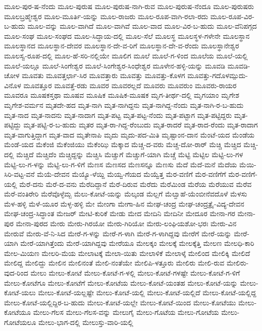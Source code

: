 ಮೂಲ-ಪುರ-ಷ-ನೆಂದು
ಮೂಲ-ಪುರುಷ
ಮೂಲ-ಪುರುಷ-ನಾಗಿ-ರುವ
ಮೂಲ-ಪುರುಷ-ನೆಂದೂ
ಮೂಲ-ಪುರುಷರು
ಮೂಲಬ್ರಹ್ಮೇಶ್ವರ
ಮೂಲ-ಮೂರ್ತಿ-ಯನ್ನು
ಮೂಲ-ರಾಜರು
ಮೂಲ-ರೂಪ-ವಾಗಿ-ರಲಾ-ರದು
ಮೂಲ-ರೂಪ-ವಿರ-ಬ-ಹುದು
ಮೂಲ-ವನ್ನು
ಮೂಲ-ವಾಗಿದೆ
ಮೂಲ-ವಾಗಿವೆ
ಮೂಲ-ವಾದ
ಮೂಲ-ವಿರ-ಬ-ಹುದು
ಮೂಲ-ವೆನಿಪಗ್ಗದ
ಮೂಲ-ಸಂಘ
ಮೂಲ-ಸಂಘದ
ಮೂಲ-ಸಿದ್ಧಾಯ-ದಲ್ಲಿ
ಮೂಲ-ಸೆಲೆ
ಮೂಲಸ್ಥ
ಮೂಲಸ್ಥಳ-ಗಳೇನೇ
ಮೂಲಸ್ಥಾನ
ಮೂಲಸ್ಥಾನದ
ಮೂಲಸ್ಥಾನ-ದೇವರ
ಮೂಲಸ್ಥಾನ-ದೇ-ವ-ರಿಗೆ
ಮೂಲಸ್ಥಾನ-ದೇ-ವ-ರೆಂದು
ಮೂಲಸ್ಥಾನೇಶ್ವರ
ಮೂಲಸ್ವ-ರೂಪ-ದಲ್ಲಿ
ಮೂಲ-ಹೆ-ಸರಿ-ನಲ್ಲಿಯೇ
ಮೂಲಿಗ
ಮೂಲೆ
ಮೂಲೆ-ಗ-ಳಿಂದ
ಮೂಲೆಯ
ಮೂಲೆ-ಯಲ್ಲಿ
ಮೂಲೆ-ಯಲ್ಲೂ
ಮೂಲೆ-ಸಿಂಗೇಶ್ವರ
ಮೂಲೆ-ಸಿಂಗೇಶ್ವರ-ಸಿಂಧೇಶ್ವರ
ಮೂಳೇನ-ಹಳ್ಳಿ-ಯನ್ನು
ಮೂವಡಿ
ಮೂವಡಿ-ಚೋಳ
ಮೂವತು
ಮೂವತ್ತರ್ಛಾ-ಸಿರ
ಮೂವತ್ತಾರು
ಮೂವತ್ತು
ಮೂವತ್ತು-ಕೊಳಗ
ಮೂವತ್ತು-ಗದೊಳಮ್ಪುದು-ವಿನೊಳ
ಮೂವತ್ತೂರ
ಮೂವತ್ತೆ-ರಡು
ಮೂವರ
ಮೂವರಲ್ಲದೆ
ಮೂವರು
ಮೂವರುಂ
ಮೂವರು-ರಾಯರ
ಮೂವರೂ
ಮೂಷಕಸ್ತಥಾ
ಮೂಷವ
ಮೂಷಿಕ
ಮೂಷಿಕ-ಮೂಷಕ
ಮೃಗ-ತೀರ್ಥ-ದಲ್ಲಿ
ಮೃಗಯಾಂ
ಮೃಗೇಶ
ಮೃಗೇಶ-ವರ್ಮನ
ಮೃತದೇ-ಹದ
ಮೃತ-ನಾಗಿ
ಮೃತ-ನಾಗಿದ್ದನು
ಮೃತ-ನಾಗಿದ್ದ-ನೆಂದು
ಮೃತ-ನಾಗಿ-ರ-ಬ-ಹುದು
ಮೃತ-ನಾದ
ಮೃತ-ನಾದನು
ಮೃತ-ನಾದಾಗ
ಮೃತ-ಪಟ್ಟ
ಮೃತ-ಪಟ್ಟ-ನೆಂದು
ಮೃತ-ಪಟ್ಟಾಗ
ಮೃತ-ಪಟ್ಟಿದ್ದರು
ಮೃತ-ಪಟ್ಟಿದ್ದು
ಮೃತ-ಪಟ್ಟಿ-ರ-ಬ-ಹುದು
ಮೃತರ
ಮೃತ-ರಾ-ಗಿದ್ದ-ರೆಂಬುದು
ಮೃತ-ರಾದರೆ
ಮೃತ-ರಾದ-ರೆಂದು
ಮೃತ-ರಾದಾಗ
ಮೃತ-ವಾಗುತ್ತಿದ್ದಾಗ
ಮೃತ-ವಾದ
ಮೃತೇನಾಪಿ
ಮೃದು
ಮೃದು-ಪದ-ಮಿತಿ
ಮೃಷ್ಟಾಂನ-ದಾನ
ಮೆಂಟೆ-ಯದ
ಮೆಂಡೆಯ
ಮೆಂಡೆ-ಯದ
ಮೆಕೆಂಜಿ
ಮೆಕೆಂಜಿಯು
ಮೆಕೆಂಝಿ
ಮೆಕ್ಕಾದ
ಮೆಚ್ಚ-ದ-ವರು
ಮೆಚ್ಚ-ದೋ-ರಾರ್
ಮೆಚ್ಚಿ
ಮೆಚ್ಚಿದ
ಮೆಚ್ಚಿ-ದಲ್ಲಿ
ಮೆಚ್ಚಿದೆ
ಮೆಚ್ಚಿದೆಂ
ಮೆಚ್ಚಿದ್ದನ್ನು
ಮೆಚ್ಚಿಸಿ
ಮೆಚ್ಚುಗೆ
ಮೆಚ್ಚುಗೆ-ಯಾಗಿ
ಮೆಚ್ಚೆ
ಮೆಟ್ಟಿ
ಮೆಟ್ಟಿಲ
ಮೆಟ್ಟಿ-ಲು-ಗಳ
ಮೆಟ್ಟಿ-ಲು-ಗ-ಳನ್ನು
ಮೆಟ್ಟಿ-ಲು-ಗ-ಳಿಗೆ
ಮೆಣಸ
ಮೆಣಸದ
ಮೆಣಸನ್ನೂ
ಮೆಣಸು
ಮೆದೆ
ಮೆದೆ-ಮನೆ
ಮೆದೆಯ
ಮೆಯಿ-ಸಿರಿ-ವಟ್ಟ-ವನೆ
ಮೆಯೆ-ದೇವನ
ಮೆಯ್ಯೊ-ಳೆಯ್ದಿ
ಮೆಯ್ವ-ಗೆಯದ
ಮೆಯ್ವೆತ್ತ
ಮೆರ-ವಣಿಗೆ
ಮೆರ-ವಣಿಗೆಗೆ
ಮೆರ-ವಣಿಗೆ-ಯಲ್ಲಿ
ಮೆರೆ-ದನು
ಮೆರೆ-ದ-ವನು
ಮೆರೆದಿದ್ದಾನೆ
ಮೆರೆ-ದಿರುವ
ಮೆರೆದು
ಮೆರೆಮಿಂಡ
ಮೆರೆಯ
ಮೆರೆಯುವ
ಮೆರೆವ
ಮೆರೆ-ವಂತಿರೇರಿ
ಮೆರೆವೊಳ್ಳೆಮ್ಬ
ಮೆಲು-ಕೋಟೆ-ಯನ್ನು
ಮೆಲ್ಕಂಡ
ಮೆಲ್ಲಗೆ
ಮೆಲ್ವಾಹೆ-ಯೆಂಬೀನೆವದೊಳೆ
ಮೆಳಸು
ಮೆಳ-ಹಳ್ಳಿ
ಮೆಳೆ-ಯೂರ
ಮೆಳ್ಳ-ಹಳ್ಳಿ
ಮೇ
ಮೇಂಗಾ
ಮೇಗಾ-ಹಿನ
ಮೇಘ-ಚಂದ್ರ
ಮೇಘ-ಚಂದ್ರತ್ರೈ-ವಿದ್ಯ-ದೇವನ
ಮೇಘ-ಚಂದ್ರ-ಸಿದ್ಧಾಂತ
ಮೇಜರ್
ಮೇಟಿ-ಕುರಿಕೆ
ಮೇಡು
ಮೇದ
ಮೇದಿನಿ
ಮೇದಿನೀ
ಮೇದೂರ
ಮೇನಾ-ಗರ
ಮೇನಾ-ಪುರ
ಮೇನಾ-ಪುರದ
ಮೇರು
ಮೇರು-ಗಿರಯೋ
ಮೇರು-ಗಿರಿಯೋ
ಮೇರು-ಲಂಘಿಯಶೋ-ಭರಃ
ಮೇರು-ವಿನ
ಮೇರುವೆ
ಮೇರು-ವೆ-ನಿ-ಸಿದ
ಮೇರೆ-ಗ-ಳನ್ನು
ಮೇರೆ-ಗ-ಳಾಗಿ
ಮೇರೆ-ಗ-ಳಾಗಿದ್ದವು
ಮೇರೆಗೆ
ಮೇರೆ-ಯನ್ನು
ಮೇರೆ-ಯಾಗಿ
ಮೇರೆ-ಯಾಗಿತ್ತೆಂದು
ಮೇರೆ-ಯಾಗಿದ್ದವು
ಮೇರೆಯೂ
ಮೇಲಕ್ಕಂ
ಮೇಲಕ್ಕೆ
ಮೇಲಕ್ಕೆತ್ತಿ
ಮೇಲಣ
ಮೇಲಧಿ-ಕಾರಿ
ಮೇಲ-ಮಿಯಣ
ಮೇಲರಿ-ಮೆಯ
ಮೇಲಾಟಕ್ಕೆ
ಮೇಲಾ-ಯಿತು
ಮೇಲಾಳಿಕೆ
ಮೇಲಾಳ್ಕೆ
ಮೇಲಿಂದ
ಮೇಲಿಕ್ಕಿ
ಮೇಲಿದೆ
ಮೇಲಿದ್ದ
ಮೇಲಿದ್ದು
ಮೇಲಿನ
ಮೇಲಿನಂತೆ
ಮೇಲಿ-ನಂತೆಯೇ
ಮೇಲಿಪಿ-ಳತ್ತೂರು
ಮೇಲಿರು
ಮೇಲಿ-ರುವ
ಮೇಲಿರು-ವುದ-ರಿಂದ
ಮೇಲು
ಮೇಲು-ಕೋಟೆ
ಮೇಲು-ಕೋಟೆ-ಗ-ಳಲ್ಲಿ
ಮೇಲು-ಕೋಟೆ-ಗಳಷ್ಟೇ
ಮೇಲು-ಕೋಟೆ-ಗ-ಳಿಗೆ
ಮೇಲು-ಕೋಟೆಗೂ
ಮೇಲು-ಕೋಟೆಗೆ
ಮೇಲು-ಕೋಟೆಯ
ಮೇಲು-ಕೋಟೆ-ಯಂತಹ
ಮೇಲು-ಕೋಟೆ-ಯನ್ನು
ಮೇಲು-ಕೋಟೆ-ಯಲು
ಮೇಲು-ಕೋಟೆ-ಯಲ್ಲಷ್ಟೇ
ಮೇಲು-ಕೋಟೆ-ಯಲ್ಲಿ
ಮೇಲು-ಕೋಟೆ-ಯಲ್ಲಿದೆ
ಮೇಲು-ಕೋಟೆ-ಯಲ್ಲಿದ್ದ
ಮೇಲು-ಕೋಟೆ-ಯಲ್ಲಿದ್ದಿರ-ಬ-ಹುದು
ಮೇಲು-ಕೋಟೆ-ಯಲ್ಲೇ
ಮೇಲು-ಕೋಟೆ-ಯಿಂದ
ಮೇಲು-ಕೋಟೆಯು
ಮೇಲು-ಕೋಟೆಯೂ
ಮೇಲು-ಗೆಲಸ
ಮೇಲು-ಗೆಲಸ-ವನ್ನು
ಮೇಲುಗೈ
ಮೇಲು-ಗೊಟೆಯ
ಮೇಲು-ಗೋಟೆಯ
ಮೇಲು-ಗೋಟೆಯಲೂ
ಮೇಲು-ಭಾಗ-ದಲ್ಲಿ
ಮೇಲುಸ್ತು-ವಾರಿ-ಯಲ್ಲಿ
